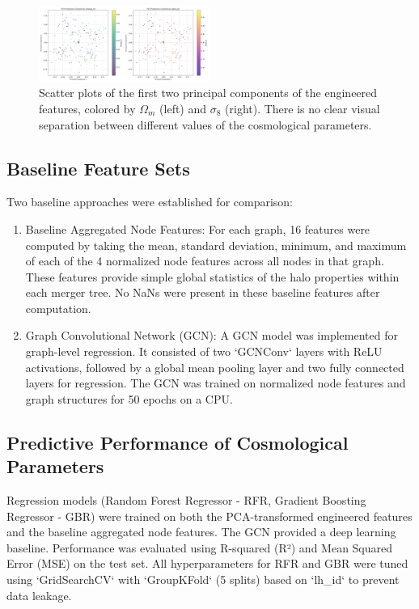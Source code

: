 \documentclass[twocolumn]{aastex631}
\begin{document}
\begin{figure}[h!]
    \centering
    \includegraphics[width=0.5\textwidth]{../input_files/plots/pca_projection_plot_6_20250527-135752.png}
    \caption{Scatter plots of the first two principal components of the engineered features, colored by $\Omega_m$ (left) and $\sigma_8$ (right). There is no clear visual separation between different values of the cosmological parameters.}
    \label{fig:pca_projection}
\end{figure}

\subsection{Baseline Feature Sets}

Two baseline approaches were established for comparison:
\begin{enumerate}
    \item Baseline Aggregated Node Features: For each graph, 16 features were computed by taking the mean, standard deviation, minimum, and maximum of each of the 4 normalized node features across all nodes in that graph. These features provide simple global statistics of the halo properties within each merger tree. No NaNs were present in these baseline features after computation.
    \item Graph Convolutional Network (GCN): A GCN model was implemented for graph-level regression. It consisted of two `GCNConv` layers with ReLU activations, followed by a global mean pooling layer and two fully connected layers for regression. The GCN was trained on normalized node features and graph structures for 50 epochs on a CPU.
\end{enumerate}

\subsection{Predictive Performance of Cosmological Parameters}

Regression models (Random Forest Regressor - RFR, Gradient Boosting Regressor - GBR) were trained on both the PCA-transformed engineered features and the baseline aggregated node features. The GCN provided a deep learning baseline. Performance was evaluated using R-squared (R²) and Mean Squared Error (MSE) on the test set. All hyperparameters for RFR and GBR were tuned using `GridSearchCV` with `GroupKFold` (5 splits) based on `lh\_id` to prevent data leakage.
\end{document}
